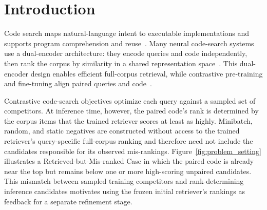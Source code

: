 \documentclass[11pt]{article}
\begin{document}
\section{Introduction}
\label{sec:introduction}

Code search maps natural-language intent to executable implementations and supports program comprehension and reuse~\citep{CodeSearchSurvey}. Many neural code-search systems use a dual-encoder architecture: they encode queries and code independently, then rank the corpus by similarity in a shared representation space~\citep{CodeBERT,GraphCodeBERT,UniXcoder}. This dual-encoder design enables efficient full-corpus retrieval, while contrastive pre-training and fine-tuning align paired queries and code~\citep{CodeRetriever,CoCoSoDa}.

Contrastive code-search objectives optimize each query against a sampled set of competitors. At inference time, however, the paired code's rank is determined by the corpus items that the trained retriever scores at least as highly. Minibatch, random, and static negatives are constructed without access to the trained retriever's query-specific full-corpus ranking and therefore need not include the candidates responsible for its observed mis-rankings. Figure~\ref{fig:problem_setting} illustrates a Retrieved-but-Mis-ranked Case in which the paired code is already near the top but remains below one or more high-scoring unpaired candidates. This mismatch between sampled training competitors and rank-determining inference candidates motivates using the frozen initial retriever's rankings as feedback for a separate refinement stage.
\end{document}
